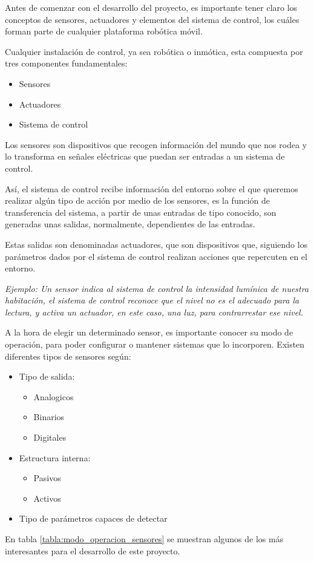 Antes de comenzar con el desarrollo del proyecto, es importante tener claro los conceptos de sensores, actuadores y elementos del sistema de control, los cuáles forman parte de cualquier plataforma robótica móvil. \newline

Cualquier instalación de control, ya sea robótica o inmótica, esta compuesta por tres componentes fundamentales:
\begin{itemize}
	\item Sensores
	\item Actuadores
	\item Sistema de control
\end{itemize}

Los sensores son dispositivos que recogen información del mundo que nos rodea y lo transforma en señales eléctricas que puedan ser entradas a un sistema de control. \newline

Así, el sistema de control recibe información del entorno sobre el que queremos realizar algún tipo de acción por medio de los sensores, es la función de transferencia del sistema, a partir de unas entradas de tipo conocido, son generadas unas salidas, normalmente, dependientes de las entradas. \newline

Estas salidas son denominadas actuadores, que son dispositivos que, siguiendo los parámetros dados por el sistema de control realizan acciones que repercuten en el entorno. \newline

\textsl{Ejemplo: Un sensor indica al sistema de control la intensidad lumínica de nuestra habitación, el sistema de control reconoce que el nivel no es el adecuado para la lectura, y activa un actuador, en este caso, una luz, para contrarrestar ese nivel.}

A la hora de elegir un determinado sensor, es importante conocer su modo de operación, para poder configurar o mantener sistemas que lo incorporen. Existen diferentes tipos de sensores según:

\begin{itemize}
	\item Tipo de salida: \begin{itemize}
		\item Analogicos
		\item Binarios
		\item Digitales
	\end{itemize} 
	
	\item Estructura interna: \begin{itemize}
		\item Pasivos
		\item Activos
	\end{itemize}
	
	\item Tipo de parámetros capaces de detectar
\end{itemize}
 En tabla \ref{tabla:modo_operacion_sensores} se muestran algunos de los más interesantes para el desarrollo de este proyecto.

